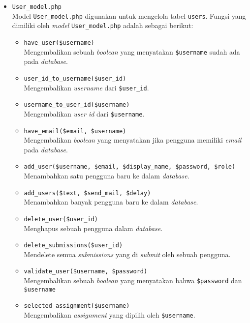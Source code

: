 \begin{itemize}
	\item \verb|User_model.php| \\
	      Model \verb|User_model.php| digunakan untuk mengelola tabel \verb|users|. Fungsi yang dimiliki oleh \textit{model} \verb|User_model.php| adalah sebagai berikut:

	      \begin{itemize}
		      \item \verb|have_user($username)| \\
		            Mengembalikan sebuah \textit{boolean} yang menyatakan \verb|$username| sudah ada pada \textit{database}.
		      \item \verb|user_id_to_username($user_id)| \\
		            Mengembalikan \textit{username} dari \verb|$user_id|.
		      \item \verb|username_to_user_id($username)| \\
		            Mengembalikan \textit{user id} dari \verb|$username|.
		      \item \verb|have_email($email, $username)| \\
		            Mengembalikan \textit{boolean} yang menyatakan jika pengguna memiliki \textit{email} pada \textit{database}.
		      \item \verb|add_user($username, $email, $display_name, $password, $role)| \\
		            Menambahkan satu pengguna baru ke dalam \textit{database}.
		      \item \verb|add_users($text, $send_mail, $delay)| \\
		            Menambahkan banyak pengguna baru ke dalam \textit{database}.
		      \item \verb|delete_user($user_id)| \\
		            Menghapus sebuah pengguna dalam \textit{database}.
		      \item \verb|delete_submissions($user_id)| \\
		            Mendelete semua \textit{submissions} yang di \textit{submit} oleh sebuah pengguna.
		      \item \verb|validate_user($username, $password)| \\
		            Mengembalikan sebuah \textit{boolean} yang menyatakan bahwa \verb|$password| dan \verb|$username|
		      \item \verb|selected_assignment($username)| \\
		            Mengembalikan \textit{assignment} yang dipilih oleh \verb|$username|.

\end{itemize}
\end{itemize}
